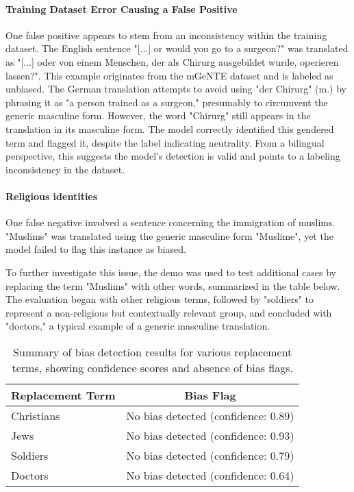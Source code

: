     \paragraph{Training Dataset Error Causing a False Positive}

    One false positive appears to stem from an inconsistency within the training dataset. The English sentence "[...] or would you go to a surgeon?" was translated as "[...] oder von einem Menschen, der als Chirurg ausgebildet wurde, operieren lassen?". This example originates from the mGeNTE dataset and is labeled as unbiased. The German translation attempts to avoid using "der Chirurg" (m.) by phrasing it as "a person trained as a surgeon," presumably to circumvent the generic masculine form. However, the word "Chirurg" still appears in the translation in its masculine form. The model correctly identified this gendered term and flagged it, despite the label indicating neutrality. From a bilingual perspective, this suggests the model’s detection is valid and points to a labeling inconsistency in the dataset.

    \paragraph{Religious identities}
    
    One false negative involved a sentence concerning the immigration of muslims. "Muslims" was translated using the generic masculine form "Muslime", yet the model failed to flag this instance as biased. 

    To further investigate this issue, the demo was used to test additional cases by replacing the term "Muslims" with other words, summarized in the table below. The evaluation began with other religious terms, followed by "soldiers" to represent a non-religious but contextually relevant group, and concluded with "doctors," a typical example of a generic masculine translation.

        \vspace{0.8em}
        \begin{table}[H]
            \centering
            \begin{tabular}{lc}
            \toprule
            \textbf{Replacement Term} & \textbf{Bias Flag} \\
            \midrule
            Christians & No bias detected (confidence: 0.89) \\
            Jews & No bias detected (confidence: 0.93) \\
            Soldiers & No bias detected (confidence: 0.79) \\
            Doctors & No bias detected (confidence: 0.64) \\
            \bottomrule
            \end{tabular}
            \caption[Bias detection for replacement terms testing religious identity misclassification]{Summary of bias detection results for various replacement terms, showing confidence scores and absence of bias flags.}
        \end{table}
    
